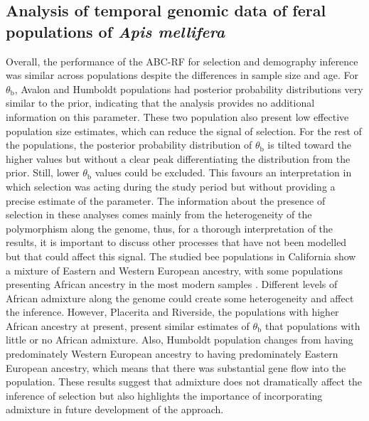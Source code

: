 \documentclass[a4paper, 12pt]{article}
\begin{document}
\subsection*{Analysis of temporal genomic data of feral populations of \textit{Apis mellifera}}

Overall, the performance of the ABC-RF for selection and demography inference was similar across populations despite the differences in sample size and age. For $\theta_{\mathrm{b}}$, Avalon and Humboldt populations had posterior probability distributions very similar to the prior, indicating that the analysis provides no additional information on this parameter. These two population also present low effective population size estimates, which can reduce the signal of selection. For the rest of the populations, the posterior probability distribution of $\theta_{\mathrm{b}}$ is tilted toward the higher values but without a clear peak differentiating the distribution from the prior. Still, lower $\theta_{\mathrm{b}}$ values could be excluded. This favours an interpretation in which selection was acting during the study period but without providing a precise estimate of the parameter. The information about the presence of selection in these analyses comes mainly from the heterogeneity of the polymorphism along the genome, thus, for a thorough interpretation of the results, it is important to discuss other processes that have not been modelled but that could affect this signal. The studied bee populations in California show a mixture of Eastern and Western European ancestry, with some populations presenting African ancestry in the most modern samples \citet{Cridland:2018fx}. Different levels of African admixture along the genome could create some heterogeneity and affect the inference. However, Placerita and Riverside, the populations with higher African ancestry at present, present similar estimates of $\theta_{\mathrm{b}}$ that populations with little or no African admixture. Also, Humboldt population changes from having predominately Western European ancestry to having predominately Eastern European ancestry, which means that there was substantial gene flow into the population. These results suggest that admixture does not dramatically affect the inference of selection but also highlights the importance of incorporating admixture in future development of the approach.

\end{document}
